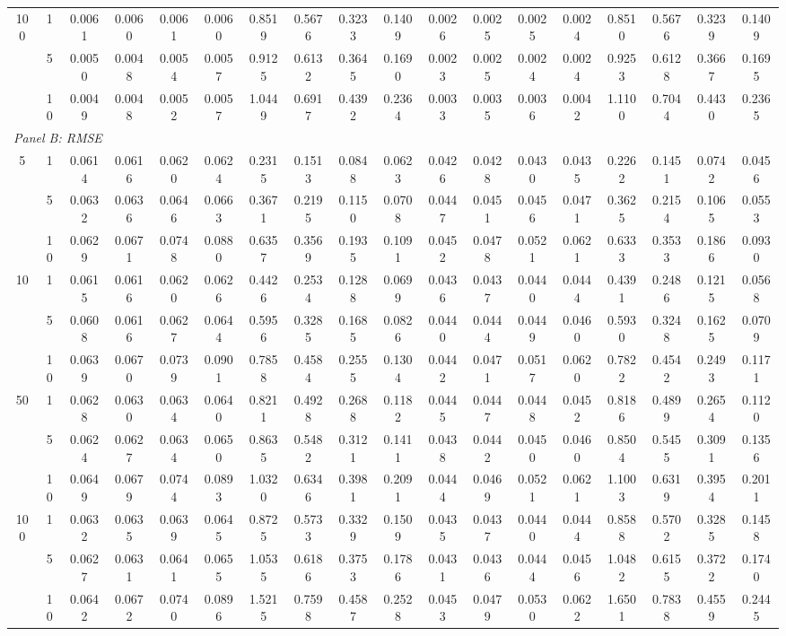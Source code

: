 \documentclass[12pt]{article}
\numberwithin{equation}{section}
\begin{document}
\begin{table}
{\begin{tabular}{cc|cccc cccc|cccc cccc}
100 & 1  & 0.0061 & 0.0060 & 0.0061 & 0.0060 & 0.8519 & 0.5676 & 0.3233 & 0.1409 & 0.0026 & 0.0025 & 0.0025 & 0.0024 & 0.8510 & 0.5676 & 0.3239 & 0.1409 \\
    & 5  & 0.0050 & 0.0048 & 0.0054 & 0.0057 & 0.9125 & 0.6132 & 0.3645 & 0.1690 & 0.0023 & 0.0025 & 0.0024 & 0.0024 & 0.9253 & 0.6128 & 0.3667 & 0.1695 \\
    & 10 & 0.0049 & 0.0048 & 0.0052 & 0.0057 & 1.0449 & 0.6917 & 0.4392 & 0.2364 & 0.0033 & 0.0035 & 0.0036 & 0.0042 & 1.1100 & 0.7044 & 0.4430 & 0.2365 \\
\hline
\multicolumn{18}{l}{\textit{Panel B: RMSE}}\\
5   & 1  & 0.0614 & 0.0616 & 0.0620 & 0.0624 & 0.2315 & 0.1513 & 0.0848 & 0.0623 & 0.0426 & 0.0428 & 0.0430 & 0.0435 & 0.2262 & 0.1451 & 0.0742 & 0.0456 \\
    & 5  & 0.0632 & 0.0636 & 0.0646 & 0.0663 & 0.3671 & 0.2195 & 0.1150 & 0.0708 & 0.0447 & 0.0451 & 0.0456 & 0.0471 & 0.3625 & 0.2154 & 0.1065 & 0.0553 \\
    & 10 & 0.0629 & 0.0671 & 0.0748 & 0.0880 & 0.6357 & 0.3569 & 0.1935 & 0.1091 & 0.0452 & 0.0478 & 0.0521 & 0.0621 & 0.6333 & 0.3533 & 0.1866 & 0.0930 \\
10  & 1  & 0.0615 & 0.0616 & 0.0620 & 0.0626 & 0.4426 & 0.2534 & 0.1288 & 0.0699 & 0.0436 & 0.0437 & 0.0440 & 0.0444 & 0.4391 & 0.2486 & 0.1215 & 0.0568 \\
    & 5  & 0.0608 & 0.0616 & 0.0627 & 0.0644 & 0.5956 & 0.3285 & 0.1685 & 0.0826 & 0.0440 & 0.0444 & 0.0449 & 0.0460 & 0.5930 & 0.3248 & 0.1625 & 0.0709 \\
    & 10 & 0.0639 & 0.0670 & 0.0739 & 0.0901 & 0.7858 & 0.4584 & 0.2555 & 0.1304 & 0.0442 & 0.0471 & 0.0517 & 0.0620 & 0.7822 & 0.4542 & 0.2493 & 0.1171 \\
50  & 1  & 0.0628 & 0.0630 & 0.0634 & 0.0640 & 0.8211 & 0.4928 & 0.2688 & 0.1182 & 0.0445 & 0.0447 & 0.0448 & 0.0452 & 0.8186 & 0.4899 & 0.2654 & 0.1120 \\
    & 5  & 0.0624 & 0.0627 & 0.0634 & 0.0650 & 0.8635 & 0.5482 & 0.3121 & 0.1411 & 0.0438 & 0.0442 & 0.0450 & 0.0460 & 0.8504 & 0.5455 & 0.3091 & 0.1356 \\
    & 10 & 0.0649 & 0.0679 & 0.0744 & 0.0893 & 1.0320 & 0.6346 & 0.3981 & 0.2091 & 0.0444 & 0.0469 & 0.0521 & 0.0621 & 1.1003 & 0.6319 & 0.3954 & 0.2011 \\
100 & 1  & 0.0632 & 0.0635 & 0.0639 & 0.0645 & 0.8725 & 0.5733 & 0.3329 & 0.1509 & 0.0435 & 0.0437 & 0.0440 & 0.0444 & 0.8588 & 0.5702 & 0.3285 & 0.1458 \\
    & 5  & 0.0627 & 0.0631 & 0.0641 & 0.0655 & 1.0535 & 0.6186 & 0.3753 & 0.1786 & 0.0431 & 0.0436 & 0.0444 & 0.0456 & 1.0482 & 0.6155 & 0.3722 & 0.1740 \\
    & 10 & 0.0642 & 0.0672 & 0.0740 & 0.0896 & 1.5215 & 0.7598 & 0.4587 & 0.2528 & 0.0453 & 0.0479 & 0.0530 & 0.0622 & 1.6501 & 0.7838 & 0.4559 & 0.2445 \\
\hline
\end{tabular}}
\label{tab:VMA_bias_RMSE}
\end{table}
\end{document}
